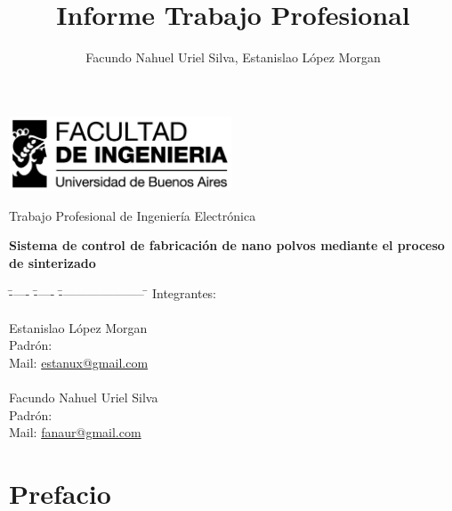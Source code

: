 \documentclass[12pt]{article}
\title{Informe Trabajo Profesional}
\author{Facundo Nahuel Uriel Silva, Estanislao López Morgan}
\begin{document}
  \newpage
  \thispagestyle{empty}
  
  \begin{center}
    \includegraphics[width=250px]{../logo_fiuba_alta.jpg} 

  \vspace{100px}

  \huge{Trabajo Profesional de Ingeniería Electrónica}
  \vspace{50px}

  \bf{ \huge{Sistema de control de fabricación de nano polvos mediante el proceso de sinterizado} }


  \vspace{80px}

  \end{center}
  
  \begin{bf}
    \begin{Large}
      \begin{tabbing}
	\= ----- \= ----- \= --------------------- \= \kill
	\> Integrantes:\\
	\\
	  \>\> Estanislao López Morgan \\
	  \>\>\>  Padrón:	 \\
	  \>\>\>  Mail:	\>\url{estanux@gmail.com} \\
	\\
	  \>\> Facundo Nahuel Uriel Silva\\
	  \>\>\>  Padrón:	 \\
	  \>\>\>  Mail:	\> \url{fanaur@gmail.com}\\
      \end{tabbing}
    \end{Large}
  \end{bf}
  
  \newpage
\section*{Prefacio}
\end{document}
